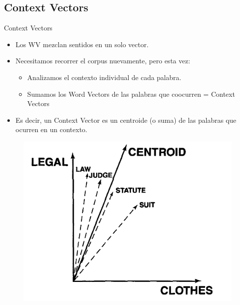 \documentclass[xcolor=x11names,compress]{beamer}
\renewcommand{\(}{\begin{columns}}
\renewcommand{\)}{\end{columns}}
\newcommand{\<}[1]{\begin{column}{#1}}
\renewcommand{\>}{\end{column}}
\begin{document}
\subsection{Context Vectors}
\begin{frame}{Context Vectors}
\begin{itemize}
\item Los WV mezclan sentidos en un solo vector.
\item Necesitamos recorrer el corpus nuevamente, pero esta vez:
\begin{itemize}
\item Analizamos el contexto individual de cada palabra.
\item Sumamos los Word Vectors de las palabras que coocurren = Context Vectors
\end{itemize}
\item Es decir, un Context Vector es un centroide (o suma) de las palabras que ocurren en un contexto.
\end{itemize}
\begin{figure}
\centering
\includegraphics[scale=0.24, keepaspectratio=True, natwidth=800,natheight=600]{context_vector.png}
\end{figure}
\end{frame}

\end{document}
